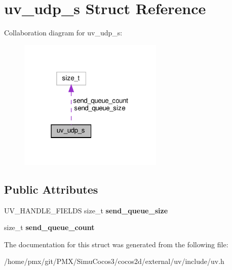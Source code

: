 \hypertarget{structuv__udp__s}{}\section{uv\+\_\+udp\+\_\+s Struct Reference}
\label{structuv__udp__s}


Collaboration diagram for uv\+\_\+udp\+\_\+s\+:
\nopagebreak
\begin{figure}[H]
\begin{center}
\leavevmode
\includegraphics[width=195pt]{structuv__udp__s__coll__graph}
\end{center}
\end{figure}
\subsection*{Public Attributes}
\begin{DoxyCompactItemize}
\item 
\mbox{\label{structuv__udp__s_aa2bee970d8f44dde82ed2ec8c603bf14}} 
U\+V\+\_\+\+H\+A\+N\+D\+L\+E\+\_\+\+F\+I\+E\+L\+DS size\+\_\+t {\bfseries send\+\_\+queue\+\_\+size}
\item 
\mbox{\label{structuv__udp__s_a3e33dd00e19e84788826c7c8b161a086}} 
size\+\_\+t {\bfseries send\+\_\+queue\+\_\+count}
\end{DoxyCompactItemize}


The documentation for this struct was generated from the following file\+:\begin{DoxyCompactItemize}
\item 
/home/pmx/git/\+P\+M\+X/\+Simu\+Cocos3/cocos2d/external/uv/include/uv.\+h\end{DoxyCompactItemize}
